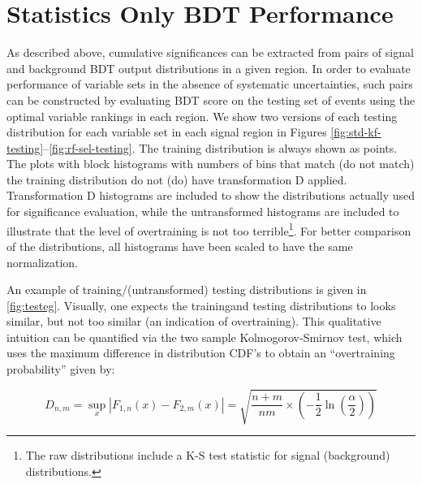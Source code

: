 \section{Statistics Only BDT Performance}
\label{subsec:statonlyperf}
As described above, cumulative significances can be extracted from pairs of signal and background BDT output distributions in a given region.  In order to evaluate performance of variable sets in the absence of systematic uncertainties, such pairs can be constructed by evaluating BDT score on the testing set of events using the optimal variable rankings in each region.  We show two versions of each testing distribution for each variable set in each signal region in Figures \ref{fig:std-kf-testing}--\ref{fig:rf-sel-testing}.  The training distribution is always shown as points.  The plots with block histograms with numbers of bins that match (do not match) the training distribution do not (do) have transformation D applied.  Transformation D histograms are included to show the distributions actually used for significance evaluation, while the untransformed histograms are included to illustrate that the level of overtraining is not too terrible\footnote{The raw distributions include a K-S test statistic for signal (background) distributions.}.  For better comparison of the distributions, all histograms have been scaled to have the same normalization.

An example of training/(untransformed) testing distributions is given in \ref{fig:testeg}.  Visually, one expects the trainingand testing distributions to looks similar, but not too similar (an indication of overtraining).  This qualitative intuition can be quantified via the two sample Kolmogorov-Smirnov test, which uses the maximum difference in distribution CDF's to obtain an ``overtraining probability'' given by:

\begin{equation}
\label{eq:ks}
D_{n,m}=\sup_{x}\left|F_{1,n}\left(x\right)-F_{2,m}\left(x\right)\right|=\sqrt{\frac{n+m}{nm}\times\left(-\frac{1}{2}\ln\left(\frac{\alpha}{2}\right)\right)}
\end{equation}

